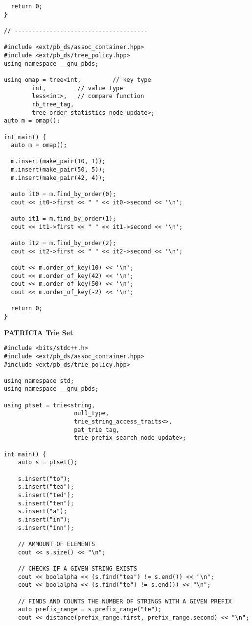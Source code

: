 \documentclass{article}
\begin{document}
\begin{multicols}{2}
\begin{lstlisting}
  return 0;
}

// --------------------------------------

#include <ext/pb_ds/assoc_container.hpp>
#include <ext/pb_ds/tree_policy.hpp>
using namespace __gnu_pbds;

using omap = tree<int,         // key type
		int,         // value type
		less<int>,   // compare function
		rb_tree_tag,
		tree_order_statistics_node_update>;
auto m = omap();

int main() {
  auto m = omap();

  m.insert(make_pair(10, 1));
  m.insert(make_pair(50, 5));
  m.insert(make_pair(42, 4));

  auto it0 = m.find_by_order(0);
  cout << it0->first << " " << it0->second << '\n';

  auto it1 = m.find_by_order(1);
  cout << it1->first << " " << it1->second << '\n';

  auto it2 = m.find_by_order(2);
  cout << it2->first << " " << it2->second << '\n';

  cout << m.order_of_key(10) << '\n';
  cout << m.order_of_key(42) << '\n';
  cout << m.order_of_key(50) << '\n';
  cout << m.order_of_key(-2) << '\n';

  return 0;
}
\end{lstlisting}

\huge\textbf{PATRICIA Trie Set}
\begin{lstlisting}
#include <bits/stdc++.h>
#include <ext/pb_ds/assoc_container.hpp>
#include <ext/pb_ds/trie_policy.hpp>

using namespace std;
using namespace __gnu_pbds;

using ptset = trie<string,
					null_type,
					trie_string_access_traits<>,
					pat_trie_tag,
					trie_prefix_search_node_update>;

int main() {
	auto s = ptset();

	s.insert("to");
	s.insert("tea");
	s.insert("ted");
	s.insert("ten");
	s.insert("a");
	s.insert("in");
	s.insert("inn");

	// AMMOUNT OF ELEMENTS
	cout << s.size() << "\n";

	// CHECKS IF A GIVEN STRING EXISTS
	cout << boolalpha << (s.find("tea") != s.end()) << "\n";
	cout << boolalpha << (s.find("te") != s.end()) << "\n";

	// FINDS AND COUNTS THE NUMBER OF STRINGS WITH A GIVEN PREFIX
	auto prefix_range = s.prefix_range("te");
	cout << distance(prefix_range.first, prefix_range.second) << "\n";


\end{lstlisting}
\end{multicols}
\end{document}
